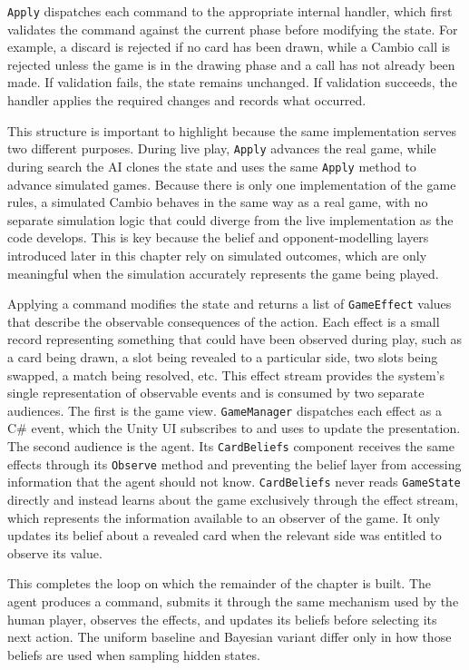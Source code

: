 \documentclass[12pt,a4paper,oneside]{report}
\begin{document}
\texttt{Apply} dispatches each command to the appropriate internal handler, which first validates the command against the current phase before modifying the state. For example, a discard is rejected if no card has been drawn, while a Cambio call is rejected unless the game is in the drawing phase and a call has not already been made. If validation fails, the state remains unchanged. If validation succeeds, the handler applies the required changes and records what occurred. 

This structure is important to highlight because the same implementation serves two different purposes. During live play, \texttt{Apply} advances the real game, while during search the AI clones the state and uses the same \texttt{Apply} method to advance simulated games. Because there is only one implementation of the game rules, a simulated Cambio behaves in the same way as a real game, with no separate simulation logic that could diverge from the live implementation as the code develops. This is key because the belief and opponent-modelling layers introduced later in this chapter rely on simulated outcomes, which are only meaningful when the simulation accurately represents the game being played.

Applying a command modifies the state and returns a list of \texttt{GameEffect} values that describe the observable consequences of the action. Each effect is a small record representing something that could have been observed during play, such as a card being drawn, a slot being revealed to a particular side, two slots being swapped, a match being resolved, etc. This effect stream provides the system's single representation of observable events and is consumed by two separate audiences. The first is the game view. \texttt{GameManager} dispatches each effect as a C\# event, which the Unity UI subscribes to and uses to update the presentation. The second audience is the agent. Its \texttt{CardBeliefs} component receives the same effects through its \texttt{Observe} method and preventing the belief layer from accessing information that the agent should not know. \texttt{CardBeliefs} never reads \texttt{GameState} directly and instead learns about the game exclusively through the effect stream, which represents the information available to an observer of the game. It only updates its belief about a revealed card when the relevant side was entitled to observe its value.

This completes the loop on which the remainder of the chapter is built. The agent produces a command, submits it through the same mechanism used by the human player, observes the effects, and updates its beliefs before selecting its next action. The uniform baseline and Bayesian variant differ only in how those beliefs are used when sampling hidden states.
\end{document}
